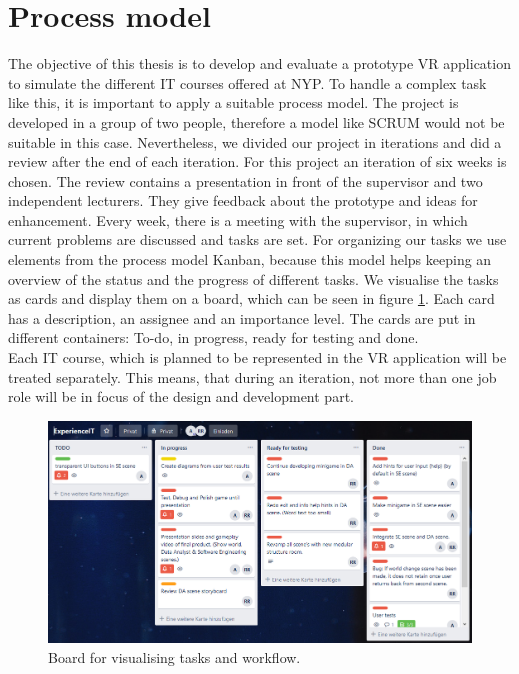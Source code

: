 \section{Process model}
The objective of this thesis is to develop and evaluate a prototype VR application to simulate the different IT courses offered at NYP. To handle a complex task like this, it is important to apply a suitable process model. The project is developed in a group of two people, therefore a model like SCRUM would not be suitable in this case. Nevertheless, we divided our project in iterations and did a review after the end of each iteration. For this project an iteration of six weeks is chosen. The review contains a presentation in front of the supervisor and two independent lecturers. They give feedback about the prototype and ideas for enhancement. Every week, there is a meeting with the supervisor, in which current problems are discussed and tasks are set. For organizing our tasks we use elements from the process model Kanban, because this model helps keeping an overview of the status and the progress of different tasks. We visualise the tasks as cards and display them on a board, which can be seen in  figure \ref{fig:board}. Each card has a description, an assignee and an importance level. The cards are put in different containers: To-do, in progress, ready for testing and done.\\
Each IT course, which is planned to be represented in the VR application will be treated separately. This means, that during an iteration, not more than one job role will be in focus of the design and development part.  
\begin{figure}[h!]
  \includegraphics[width=16cm]{kapitel/kanban-board.png}
  \centering
  \caption{Board for visualising tasks and workflow.}
  \label{fig:board}
\end{figure}
\newpage
